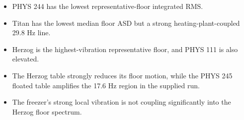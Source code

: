 \documentclass[11pt]{article}
\begin{document}
\begin{itemize}
  \item PHYS 244 has the lowest representative-floor integrated RMS.
  \item Titan has the lowest median floor ASD but a strong
  heating-plant-coupled 29.8 Hz line.
  \item Herzog is the highest-vibration representative floor, and PHYS 111 is
  also elevated.
  \item The Herzog table strongly reduces its floor motion, while the PHYS 245
  floated table amplifies the 17.6 Hz region in the supplied run.
  \item The freezer's strong local vibration is not coupling significantly
  into the Herzog floor spectrum.
\end{itemize}
\end{document}
